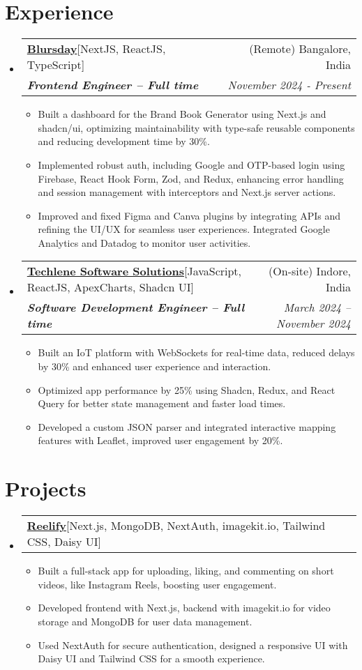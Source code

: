 \documentclass[letterpaper,10pt]{article}
\makeatletter
\newcommand{\resumeItem}[1]{
    \item\small{
      {#1 \vspace{-2pt}}
    }
  }
\newcommand{\resumeSubheading}[4]{
    \vspace{-2pt}\item
      \begin{tabular*}{0.97\textwidth}[t]{l@{\extracolsep{\fill}}r}
        {#1} & #2 \\
        \textit{\small#3} & \textit{\small #4}\\
      \end{tabular*}\vspace{-7pt}
  }
\newcommand{\resumeProjectHeading}[2]{
      \item
      \begin{tabular*}{0.97\textwidth}{l@{\extracolsep{\fill}}r}
        \small#1 & #2 \\
      \end{tabular*}\vspace{-7pt}
  }
\newcommand{\resumeSubHeadingListStart}{\begin{itemize}[leftmargin=0.15in, label={}]}
\newcommand{\resumeSubHeadingListEnd}{\end{itemize}}
\newcommand{\resumeItemListStart}{\begin{itemize}}
\newcommand{\resumeItemListEnd}{\end{itemize}\vspace{-5pt}}
\makeatother
\begin{document}

\section{Experience}

\resumeSubHeadingListStart
\resumeSubheading
{\textbf{\href{https://www.blursday.ai/}{Blursday}\hspace{5pt}}{{[NextJS, ReactJS, TypeScript]}}}{(Remote) Bangalore, India}
{\textbf{Frontend Engineer – Full time}}{November 2024 - Present }
\resumeItemListStart
\resumeItem{Built a dashboard for the Brand Book Generator using Next.js and shadcn/ui, optimizing maintainability with type-safe reusable components and reducing development time by 30\%.
}
\resumeItem{Implemented robust auth, including Google and OTP-based login using Firebase, React Hook Form, Zod, and Redux, enhancing error handling and session management with interceptors and Next.js server actions.
}
\resumeItem{Improved and fixed Figma and Canva plugins by integrating APIs and refining the UI/UX for seamless user experiences. Integrated Google Analytics and Datadog to monitor user activities.}
\resumeItemListEnd
\resumeSubHeadingListEnd


\resumeSubHeadingListStart
\resumeSubheading
  {\textbf{\href{https://www.techlene.com/}{Techlene Software Solutions}\hspace{5pt}}{[JavaScript, ReactJS, ApexCharts, Shadcn UI]}}{(On-site) Indore, India}
  {\textbf{Software Development Engineer – Full time}}{March 2024 -- November 2024}
  \resumeItemListStart
    \resumeItem{Built an IoT platform with WebSockets for real-time data, reduced delays by 30\% and enhanced user experience and interaction.}
    \resumeItem{Optimized app performance by 25\% using Shadcn, Redux, and React Query for better state management and faster load times.}
    \resumeItem{Developed a custom JSON parser and integrated interactive mapping features with Leaflet, improved user engagement by 20\%.}
  \resumeItemListEnd
\resumeSubHeadingListEnd





\section{Projects}

\resumeSubHeadingListStart
\resumeProjectHeading
{\textbf{\href{https://github.com/shanutiwari1010/reelify}
{Reelify}\hspace{5pt}}{{[Next.js, MongoDB, NextAuth, imagekit.io, Tailwind CSS, Daisy UI]}}}{}
\resumeItemListStart
\resumeItem{Built a full-stack app for uploading, liking, and commenting on short videos, like Instagram Reels, boosting user engagement.}
\resumeItem{Developed frontend with Next.js, backend with imagekit.io for video storage and MongoDB for user data management.}
\resumeItem{Used NextAuth for secure authentication, designed a responsive UI with Daisy UI and Tailwind CSS for a smooth experience.}
\resumeItemListEnd
\resumeSubHeadingListEnd
\end{document}
